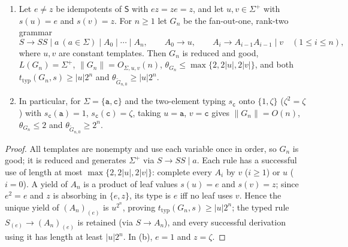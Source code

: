 \begin{proposition}
\label{prop:typed-thickness-exponential}
\begin{enumerate}[label=\textup{(\alph*)},leftmargin=*]
\item Let $e\ne z$ be idempotents of $\mathsf S$ with $ez=ze=z$, and let
$u,v\in\Sigma^+$ with $s(u)=e$ and $s(v)=z$.  For $n\ge1$ let $G_n$ be the
fan-out-one, rank-two grammar
\[
 S\to SS\mid a\ (a\in\Sigma)\mid A_0\mid\cdots\mid A_n,\qquad
 A_0\to u,\qquad
 A_i\to A_{i-1}A_{i-1}\mid v\quad(1\le i\le n),
\]
where $u,v$ are constant templates.  Then $G_n$ is reduced and good,
$L(G_n)=\Sigma^+$, $\|G_n\|=O_{\Sigma,u,v}(n)$,
$\theta_{G_n}\le\max\{2,2|u|,2|v|\}$, and both
$t_{\mathrm{typ}}(G_n,s)\ge|u|2^n$ and
$\theta_{\widetilde G_{n,0}}\ge|u|2^n$.
\item In particular, for $\Sigma=\{\mathtt a,\mathtt c\}$ and the two-element
typing $s_{\mathtt c}$ onto $\{1,\zeta\}$ ($\zeta^2=\zeta$) with
$s_{\mathtt c}(\mathtt a)=1$, $s_{\mathtt c}(\mathtt c)=\zeta$, taking $u=\mathtt a$,
$v=\mathtt c$ gives $\|G_n\|=O(n)$, $\theta_{G_n}\le2$ and
$\theta_{\widetilde G_{n,0}}\ge2^n$.
\end{enumerate}
\end{proposition}

\begin{proof}
All templates are nonempty and use each variable once in order, so $G_n$ is
good; it is reduced and generates $\Sigma^+$ via $S\to SS\mid a$.  Each rule has a
successful use of length at most $\max\{2,2|u|,2|v|\}$: complete every $A_i$ by
$v$ ($i\ge1$) or $u$ ($i=0$).  A yield of $A_n$ is a product of leaf values
$s(u)=e$ and $s(v)=z$; since $e^2=e$ and $z$ is absorbing in $\{e,z\}$, its type is
$e$ iff no leaf uses $v$.  Hence the unique yield of $(A_n)_{(e)}$ is
$u^{2^n}$, proving $t_{\mathrm{typ}}(G_n,s)\ge|u|2^n$; the typed rule $S_{(e)}\to(A_n)_{(e)}$ is retained (via
$S\to A_n$), and every successful derivation using it has length at least
$|u|2^n$.  In (b), $e=1$ and $z=\zeta$.
\end{proof}

